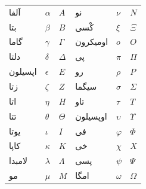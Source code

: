 \documentclass[../../../include/open-logic-chapter]{subfiles}
\begin{document}

\begin{center}
    \begin{tabular}{lll@{\qquad}lll}
    آلفا & $\alpha$ & $A$ &
    نو & $\nu$ & $N$ \\
    بتا & $\beta$ & $B$ &
    کْسی & $\xi$ & $\Xi$ \\
    گاما & $\gamma$ & $\Gamma$ &
    اومیکرون & $o$ & $O$ \\
    دلتا & $\delta$ & $\Delta$ &
    پی & $\pi$ & $\Pi$ \\
    اپسیلون & $\epsilon$ & $E$ &
    رو & $\rho$ & $P$ \\
    زتا & $\zeta$ & $Z$ &
    سیگما & $\sigma$ & $\Sigma$ \\
    اتا & $\eta$ & $H$ &
    تاو & $\tau$ & $T$ \\
    تتا & $\theta$ & $\Theta$ &
    اوپسیلون & $\upsilon$ & $\Upsilon$ \\
    یوتا & $\iota$ & $I$ &
    فی & $\varphi$ & $\Phi$ \\
    کاپا & $\kappa$ & $K$ &
    خی & $\chi$ & $X$ \\
    لامبدا & $\lambda$ & $\Lambda$ &
    پسی & $\psi$ & $\Psi$ \\
    مو & $\mu$ & $M$ &
    امگا & $\omega$ & $\Omega$
    \end{tabular}
\end{center}
\end{document}
